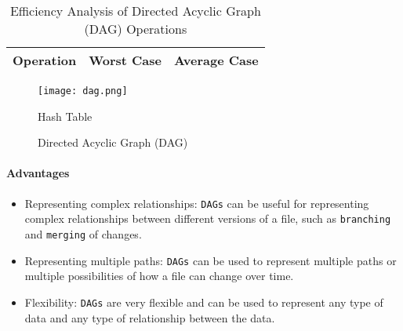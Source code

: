 \begin{table}[h]
    \centering
    \caption{Efficiency Analysis of Directed Acyclic Graph (DAG) Operations}
    \label{tab:hash-table-efficiency-analysis}
    \begin{tabular}{|c|c|c|}
        \hline
        Operation & Worst Case & Average Case \\ \hline
    \end{tabular}
\end{table}
\begin{figure}[!htbp]
    \centering
    \texttt{[image: dag.png]}
    \caption{Hash Table \cite{stemmler_2022}}
    \caption{Directed Acyclic Graph (DAG) \cite{surti_2016}}
    \label{fig:dag}
\end{figure}
\newpage

\paragraph{Advantages}
\begin{itemize}
    \item Representing complex relationships: \lstinline{DAGs} can be useful for representing complex relationships between different versions of a file, such as \lstinline{branching} and \lstinline{merging} of changes.
    \item Representing multiple paths: \lstinline{DAGs} can be used to represent multiple paths or multiple possibilities of how a file can change over time.
    \item Flexibility: \lstinline{DAGs} are very flexible and can be used to represent any type of data and any type of relationship between the data.
\end{itemize}
